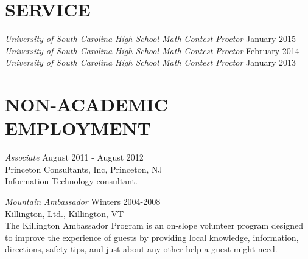 \documentclass[line,margin]{res}
\begin{document}
\begin{resume}
                          \section{SERVICE}

                          {\sl University of South Carolina High School Math Contest Proctor} \hfill January 2015\\
                          
                          {\sl University of South Carolina High School Math Contest Proctor} \hfill February 2014\\
                          
                          {\sl University of South Carolina High School Math Contest Proctor} \hfill January 2013\\
                          
                          
                          \section{NON-ACADEMIC\\EMPLOYMENT}             
                                  {\sl Associate} \hfill August 2011 - August 2012\\
                                  Princeton Consultants, Inc, Princeton, NJ\\
                                  Information Technology consultant.

                                  {\it Mountain Ambassador} \hfill Winters 2004-2008\\
                                  Killington, Ltd., Killington, VT \\
                                  The Killington Ambassador Program is an on-slope volunteer program
                                  designed to improve the experience of guests by providing local knowledge, 
                                  information, directions, safety tips, and just about any other help a guest might need.


\end{resume}
\end{document}
